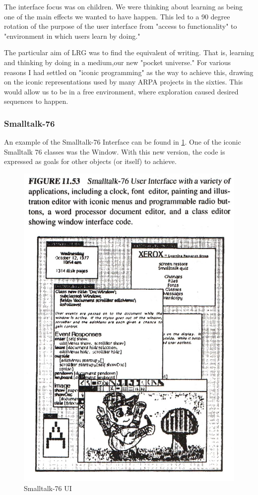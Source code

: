 \documentclass[letterpaper,12pt,parskip=full]{article}
\begin{document}
The interface focus was on children. We were thinking about learning as being one of the main effects we wanted to have happen. This led to a 90 degree rotation of the purpose of the user interface from "access to functionality" to "environment in which users learn by doing."

The particular aim of LRG was to find the equivalent of writing. That is, learning and thinking by doing in a medium,our new "pocket universe." For various reasons I had settled on "iconic programming" as the way to achieve this, drawing on the iconic representations used by many ARPA projects in the sixties. This would allow us to be in a free environment, where exploration caused desired sequences to happen.

\subsubsection{Smalltalk-76}
An example of the Smalltalk-76 Interface can be found in \ref{fig:smalltalk76ui}. One of the iconic Smalltalk 76 classes was the  Window. With this new version,  the code is expressed as goals for other objects (or itself) to achieve.

 \begin{figure}[ht]
        \centering \includegraphics[scale=0.55]{SMALLTALK76_UI.jpg}
        \caption{
                \label{fig:smalltalk76ui}
                Smalltalk-76 UI
        }
\end{figure}
\end{document}
